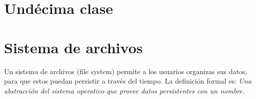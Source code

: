 \documentclass[titlepage,a4paper]{article}
\begin{document}
%
% 
%
%
%
%
%

\newpage

\section*{Undécima clase}
\section{Sistema de archivos}
Un sistema de archivos (file system) permite a los usuarios organizas sus datos, para que estos puedan persistir a través del tiempo.
La definición formal es: \textit{Una abstracción del sistema operativo que provee datos persistentes con un nombre.}
\end{document}
